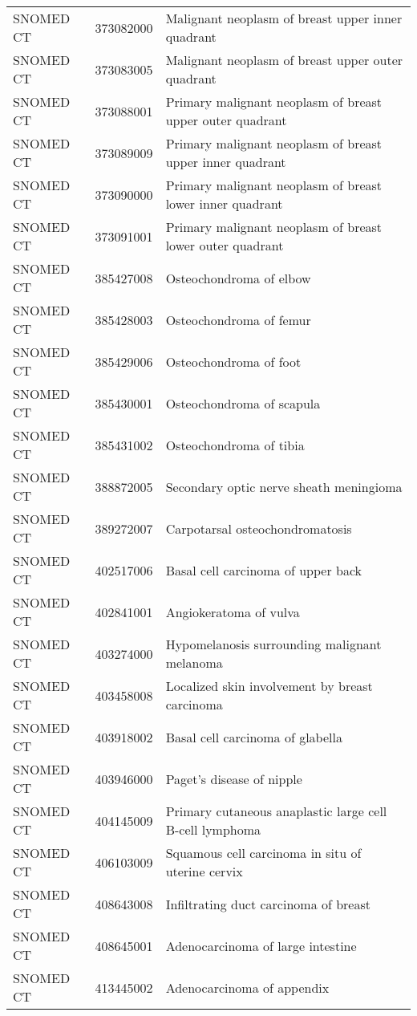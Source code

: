 \begin{longtable}{p{}p{}p{}}
  SNOMED CT & 373082000 & Malignant neoplasm of breast upper inner quadrant \\ 
  SNOMED CT & 373083005 & Malignant neoplasm of breast upper outer quadrant \\ 
  SNOMED CT & 373088001 & Primary malignant neoplasm of breast upper outer quadrant \\ 
  SNOMED CT & 373089009 & Primary malignant neoplasm of breast upper inner quadrant \\ 
  SNOMED CT & 373090000 & Primary malignant neoplasm of breast lower inner quadrant \\ 
  SNOMED CT & 373091001 & Primary malignant neoplasm of breast lower outer quadrant \\ 
  SNOMED CT & 385427008 & Osteochondroma of elbow \\ 
  SNOMED CT & 385428003 & Osteochondroma of femur \\ 
  SNOMED CT & 385429006 & Osteochondroma of foot \\ 
  SNOMED CT & 385430001 & Osteochondroma of scapula \\ 
  SNOMED CT & 385431002 & Osteochondroma of tibia \\ 
  SNOMED CT & 388872005 & Secondary optic nerve sheath meningioma \\ 
  SNOMED CT & 389272007 & Carpotarsal osteochondromatosis \\ 
  SNOMED CT & 402517006 & Basal cell carcinoma of upper back \\ 
  SNOMED CT & 402841001 & Angiokeratoma of vulva \\ 
  SNOMED CT & 403274000 & Hypomelanosis surrounding malignant melanoma \\ 
  SNOMED CT & 403458008 & Localized skin involvement by breast carcinoma \\ 
  SNOMED CT & 403918002 & Basal cell carcinoma of glabella \\ 
  SNOMED CT & 403946000 & Paget's disease of nipple \\ 
  SNOMED CT & 404145009 & Primary cutaneous anaplastic large cell B-cell lymphoma \\ 
  SNOMED CT & 406103009 & Squamous cell carcinoma in situ of uterine cervix \\ 
  SNOMED CT & 408643008 & Infiltrating duct carcinoma of breast \\ 
  SNOMED CT & 408645001 & Adenocarcinoma of large intestine \\ 
  SNOMED CT & 413445002 & Adenocarcinoma of appendix \\ 

\end{longtable}

